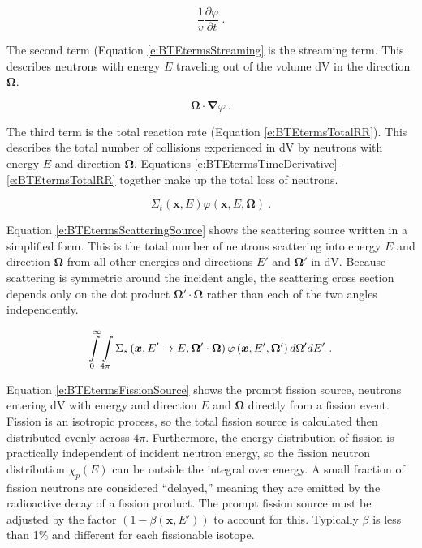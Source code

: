 \begin{equation}\label{e:BTEtermsTimeDerivative}
\frac{1}{v} \frac{\partial \varphi}{\partial t}\ .
\end{equation}

The second term (Equation \ref{e:BTEtermsStreaming} is the streaming term.  This describes neutrons with energy $E$ traveling out of the volume dV in the direction $\bm\Omega$.

\begin{equation}\label{e:BTEtermsStreaming}
\bm \Omega \cdot \bm \nabla \varphi\ .
\end{equation}

The third term is the total reaction rate (Equation \ref{e:BTEtermsTotalRR}).  This describes the total number of collisions experienced in dV by neutrons with energy $E$ and direction $\bm\Omega$.  Equations \ref{e:BTEtermsTimeDerivative}-\ref{e:BTEtermsTotalRR} together make up the total loss of neutrons.

\begin{equation}\label{e:BTEtermsTotalRR}
\Sigma_t\left(\bm x,E\right)\varphi\left(\bm x,E,\bm\Omega\right)\ .
\end{equation}

Equation \ref{e:BTEtermsScatteringSource} shows the scattering source written in a simplified form.  This is the total number of neutrons scattering into energy $E$ and direction $\bm\Omega$ from all other energies and directions $E'$ and $\bm\Omega'$ in dV.  Because scattering is symmetric around the incident angle, the scattering cross section depends only on the dot product $\bm\Omega'\cdot\bm\Omega$ rather than each of the two angles independently.

\begin{equation}\label{e:BTEtermsScatteringSource}
\intop_0^{\infty} \intop_{4\pi} \Sigma_s\left(\bm x,E' \rightarrow E, \bm \Omega' \cdot \bm \Omega\right) \varphi\left(\bm x,E',\bm \Omega'\right) d\Omega' dE'\ .
\end{equation}

Equation \ref{e:BTEtermsFissionSource} shows the prompt fission source, neutrons entering dV with energy and direction $E$ and $\bm\Omega$ directly from a fission event.  Fission is an isotropic process, so the total fission source is calculated then distributed evenly across $4\pi$.  Furthermore, the energy distribution of fission is practically independent of incident neutron energy, so the fission neutron distribution $\chi_p\left(E\right)$ can be outside the integral over energy.  A small fraction of fission neutrons are considered ``delayed,'' meaning they are emitted by the radioactive decay of a fission product.  The prompt fission source must be adjusted by the factor $\left(1-\beta\left(\bm x,E'\right)\right)$ to account for this.  Typically $\beta$ is less than 1\% and different for each fissionable isotope.


